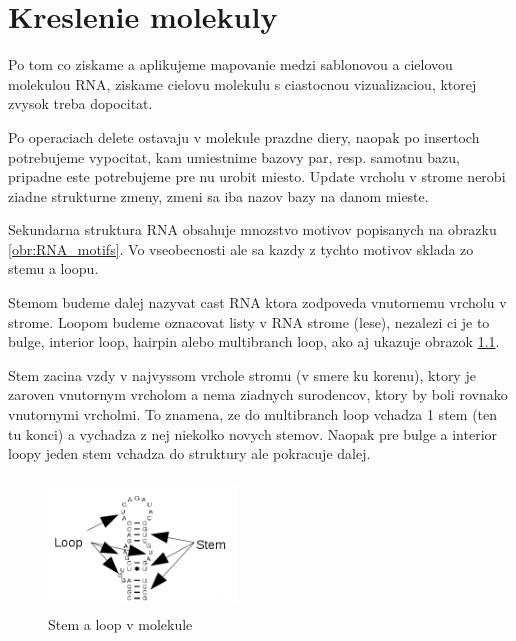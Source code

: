 
\chapter{Kreslenie molekuly}

Po tom co ziskame a aplikujeme mapovanie medzi sablonovou a cielovou molekulou RNA,
ziskame cielovu molekulu s ciastocnou vizualizaciou, ktorej zvysok treba dopocitat.

Po operaciach delete ostavaju v molekule prazdne diery, naopak po insertoch potrebujeme
vypocitat, kam umiestnime bazovy par, resp. samotnu bazu, pripadne este potrebujeme pre
nu urobit miesto. Update vrcholu v strome nerobi ziadne strukturne zmeny, zmeni sa iba
nazov bazy na danom mieste.

Sekundarna struktura RNA obsahuje mnozstvo motivov popisanych na obrazku \ref{obr:RNA_motifs}.
Vo vseobecnosti ale sa kazdy z tychto motivov sklada zo stemu a loopu.

Stemom budeme dalej nazyvat cast RNA ktora zodpoveda vnutornemu vrcholu v strome. Loopom
budeme oznacovat listy v RNA strome (lese), nezalezi ci je to bulge, interior loop, hairpin
alebo multibranch loop, ako aj ukazuje obrazok \ref{obr:RNA_motifs_stem_loop}.

Stem zacina vzdy v najvyssom vrchole stromu (v smere ku korenu), ktory je zaroven vnutornym
vrcholom a nema ziadnych surodencov, ktory by boli rovnako vnutornymi vrcholmi.
To znamena, ze do multibranch loop vchadza 1 stem (ten tu konci) a vychadza z nej niekolko novych stemov.
Naopak pre bulge a interior loopy jeden stem vchadza do struktury ale pokracuje dalej.

\begin{figure}[H]
\centering
\includegraphics[width=50mm, height=35mm]{../img/struktury_v_rna-stem_loop.png}
\caption{Stem a loop v molekule}
\label{obr:RNA_motifs_stem_loop}
\end{figure}








